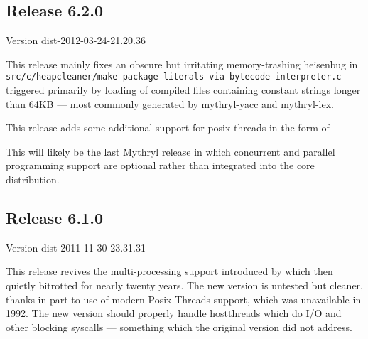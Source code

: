 
\subsection{Release 6.2.0}
\label{section:src:release-6.2.0}

Version dist-2012-03-24-21.20.36

This release mainly fixes an obscure but irritating memory-trashing heisenbug 
in {\tt src/c/heapcleaner/make-package-literals-via-bytecode-interpreter.c} 
triggered primarily by loading of compiled files containing constant strings 
longer than 64KB --- most commonly generated by mythryl-yacc and mythryl-lex. 

This release adds some additional support for posix-threads in the form of\newline
{}\newline
{}\newline
{}\newline

This will likely be the last Mythryl release in which concurrent and parallel  
programming support are optional rather than integrated into the core distribution.

\cutend*


\subsection{Release 6.1.0}
\label{section:src:release-6.1.0}

Version dist-2011-11-30-23.31.31 

This release revives the multi-processing support introduced by 
which then quietly bitrotted for nearly twenty years.  The new version is untested but cleaner, thanks in part 
to use of modern Posix Threads support, which was unavailable in 1992.  The new version should properly handle hostthreads which 
do I/O and other blocking syscalls --- something which the original version did not address. 


